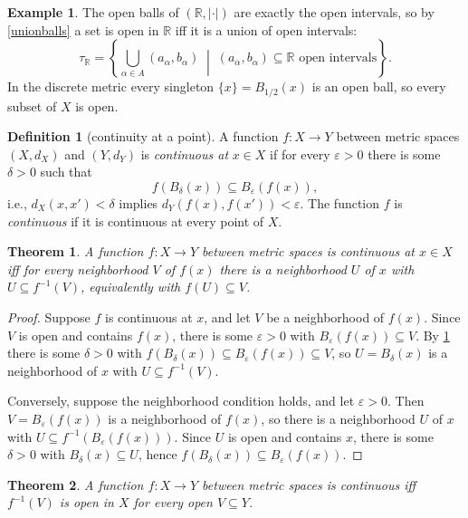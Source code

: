 \documentclass[11pt]{article}
\newtheorem{theorem}{Theorem}[section]
\theoremstyle{definition}
\newtheorem{definition}{Definition}[section]
\newtheorem{example}{Example}[section]
\theoremstyle{remark}
\begin{document}
\begin{example}
    The open balls of $(\mathbb{R}, |\cdot|)$ are exactly the open intervals, so by \cref{unionballs} a set is open in $\mathbb{R}$ iff it is a union of open intervals:
    \[
    \tau_{\mathbb{R}} = \left\{\bigcup_{\alpha \in A} (a_\alpha, b_\alpha) \;\middle|\; (a_\alpha, b_\alpha) \subseteq \mathbb{R} \text{ open intervals}\right\}.
    \]
    In the discrete metric every singleton $\{x\} = B_{1/2}(x)$ is an open ball, so every subset of $X$ is open.
\end{example}

\begin{definition}[continuity at a point]
    \label{localcontmet}
    A function $f : X \to Y$ between metric spaces $(X, d_X)$ and $(Y, d_Y)$ is \emph{continuous at} $x \in X$ if for every $\varepsilon > 0$ there is some $\delta > 0$ such that
    \[
    f(B_\delta(x)) \subseteq B_\varepsilon(f(x)),
    \]
    i.e., $d_X(x, x') < \delta$ implies $d_Y(f(x), f(x')) < \varepsilon$. The function $f$ is \emph{continuous} if it is continuous at every point of $X$.
\end{definition}

\begin{theorem}
    \label{pointwise}
    A function $f : X \to Y$ between metric spaces is continuous at $x \in X$ iff for every neighborhood $V$ of $f(x)$ there is a neighborhood $U$ of $x$ with $U \subseteq f^{-1}(V)$, equivalently with $f(U) \subseteq V$.
\end{theorem}

\begin{proof}
    Suppose $f$ is continuous at $x$, and let $V$ be a neighborhood of $f(x)$. Since $V$ is open and contains $f(x)$, there is some $\varepsilon > 0$ with $B_\varepsilon(f(x)) \subseteq V$. By \cref{localcontmet} there is some $\delta > 0$ with $f(B_\delta(x)) \subseteq B_\varepsilon(f(x)) \subseteq V$, so $U = B_\delta(x)$ is a neighborhood of $x$ with $U \subseteq f^{-1}(V)$.

    Conversely, suppose the neighborhood condition holds, and let $\varepsilon > 0$. Then $V = B_\varepsilon(f(x))$ is a neighborhood of $f(x)$, so there is a neighborhood $U$ of $x$ with $U \subseteq f^{-1}(B_\varepsilon(f(x)))$. Since $U$ is open and contains $x$, there is some $\delta > 0$ with $B_\delta(x) \subseteq U$, hence $f(B_\delta(x)) \subseteq B_\varepsilon(f(x))$.
\end{proof}

\begin{theorem}
    \label{contpreimage}
    A function $f : X \to Y$ between metric spaces is continuous iff $f^{-1}(V)$ is open in $X$ for every open $V \subseteq Y$.
\end{theorem}
\end{document}
